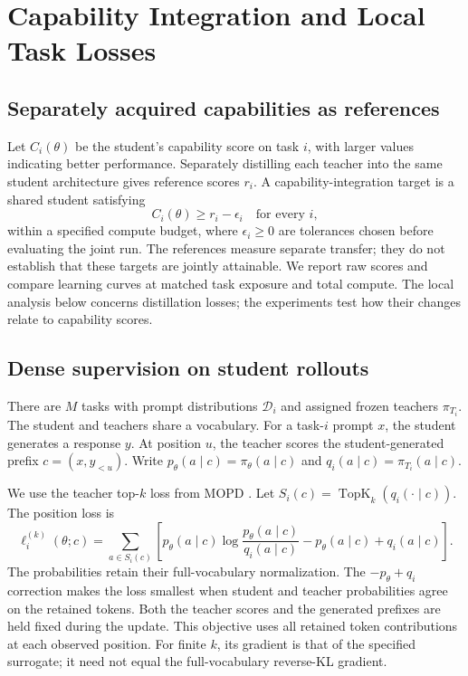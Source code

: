 \section{Capability Integration and Local Task Losses}
\label{sec:setting}

\subsection{Separately acquired capabilities as references}

Let $C_i(\theta)$ be the student's capability score on task $i$, with
larger values indicating better performance. Separately distilling each
teacher into the same student architecture gives reference scores $r_i$.
A capability-integration target is a shared student satisfying
\begin{equation}
    C_i(\theta)\geq r_i-\epsilon_i\quad\text{for every }i,
    \label{eq:capability_target}
\end{equation}
within a specified compute budget, where $\epsilon_i\geq0$ are tolerances
chosen before evaluating the joint run. The references measure separate
transfer; they do not establish that these targets are jointly attainable.
We report raw scores and compare learning curves at matched task exposure
and total compute. The local analysis below concerns distillation losses;
the experiments test how their changes relate to capability scores.

\subsection{Dense supervision on student rollouts}

There are $M$ tasks with prompt distributions $\mathcal D_i$ and assigned
frozen teachers $\pi_{T_i}$. The student and teachers share a vocabulary.
For a task-$i$ prompt $x$, the student generates a response $y$. At position
$u$, the teacher scores the student-generated prefix $c=(x,y_{<u})$.
Write $p_\theta(a\mid c)=\pi_\theta(a\mid c)$ and
$q_i(a\mid c)=\pi_{T_i}(a\mid c)$.

We use the teacher top-$k$ loss from MOPD
\citep{ma2026mopdmultiteacheronpolicydistillation}. Let
$S_i(c)=\operatorname{TopK}_k(q_i(\cdot\mid c))$. The position loss is
\begin{equation}
    \ell_i^{(k)}(\theta;c)=
    \sum_{a\in S_i(c)}
    \left[
        p_\theta(a\mid c)\log\frac{p_\theta(a\mid c)}{q_i(a\mid c)}
        -p_\theta(a\mid c)+q_i(a\mid c)
    \right].
    \label{eq:dense_topk_loss}
\end{equation}
The probabilities retain their full-vocabulary normalization. The
$-p_\theta+q_i$ correction makes the loss smallest when student and teacher
probabilities agree on the retained tokens. Both the teacher scores and the
generated prefixes are held fixed during the update. This objective uses
all retained token contributions at each observed position. For finite
$k$, its gradient is that of the specified surrogate; it need not equal
the full-vocabulary reverse-KL gradient.


